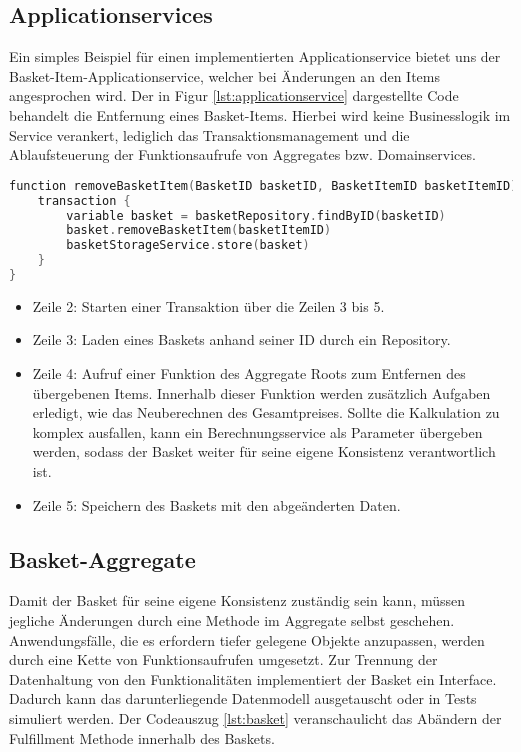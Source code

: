 \subsection{Applicationservices}

Ein simples Beispiel für einen implementierten Applicationservice bietet uns der Basket-Item-Applicationservice, welcher bei Änderungen an den Items angesprochen wird. Der in Figur \ref{lst:applicationservice} dargestellte Code behandelt die Entfernung eines Basket-Items. Hierbei wird keine Businesslogik im Service verankert, lediglich das Transaktionsmanagement und die Ablaufsteuerung der Funktionsaufrufe von Aggregates bzw. Domainservices.

\begin{minipage}{\linewidth} %
	\begin{lstlisting}[caption={Funktion zum Entfernen von Basket-Items in einem Applicationservice}, label={lst:applicationservice}, language=Kotlin]
function removeBasketItem(BasketID basketID, BasketItemID basketItemID) {
	transaction {
		variable basket = basketRepository.findByID(basketID)
		basket.removeBasketItem(basketItemID)
		basketStorageService.store(basket)
	}
}
	\end{lstlisting}


	\begin{itemize}[noitemsep,nolistsep]
		\item Zeile 2: Starten einer Transaktion über die Zeilen 3 bis 5.
		\item Zeile 3: Laden eines Baskets anhand seiner ID durch ein Repository. 
		\item Zeile 4: Aufruf einer Funktion des Aggregate Roots zum Entfernen des übergebenen Items. Innerhalb dieser Funktion werden zusätzlich Aufgaben erledigt, wie das Neuberechnen des Gesamtpreises. Sollte die Kalkulation zu komplex ausfallen, kann ein Berechnungsservice als Parameter übergeben werden, sodass der Basket weiter für seine eigene Konsistenz verantwortlich ist. 
		\item Zeile 5: Speichern des Baskets mit den abgeänderten Daten.
	\end{itemize}
\end{minipage}

\subsection{Basket-Aggregate}

Damit der Basket für seine eigene Konsistenz zuständig sein kann, müssen jegliche Änderungen durch eine Methode im Aggregate selbst geschehen. Anwendungsfälle, die es erfordern tiefer gelegene Objekte anzupassen, werden durch eine Kette von Funktionsaufrufen umgesetzt. Zur Trennung der Datenhaltung von den Funktionalitäten implementiert der Basket ein Interface. Dadurch kann das darunterliegende Datenmodell ausgetauscht oder in Tests simuliert werden. Der Codeauszug \ref{lst:basket} veranschaulicht das Abändern der Fulfillment Methode innerhalb des Baskets.

